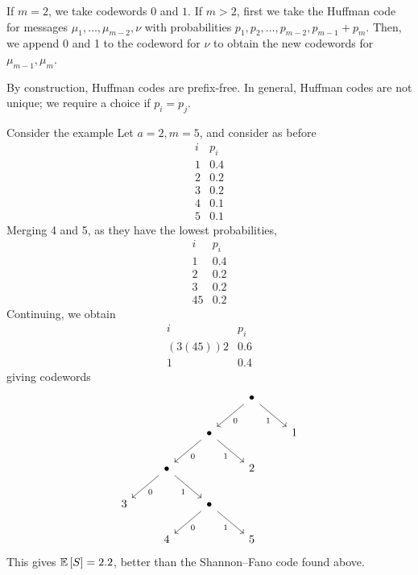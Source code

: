 If \( m = 2 \), we take codewords \( 0 \) and \( 1 \).
If \( m > 2 \), first we take the Huffman code for messages \( \mu_1, \dots, \mu_{m-2}, \nu \) with probabilities \( p_1, p_2, \dots, p_{m-2}, p_{m-1} + p_m \).
Then, we append 0 and 1 to the codeword for \( \nu \) to obtain the new codewords for \( \mu_{m-1}, \mu_m \).
\begin{remark}
    By construction, Huffman codes are prefix-free.
    In general, Huffman codes are not unique; we require a choice if \( p_i = p_j \).
\end{remark}
\begin{example}
    Consider the example
    Let \( a = 2, m = 5 \), and consider as before
    \[ \begin{array}{cc}
            i & p_i \\
            1 & 0.4 \\
            2 & 0.2 \\
            3 & 0.2 \\
            4 & 0.1 \\
            5 & 0.1
    \end{array} \]
    Merging 4 and 5, as they have the lowest probabilities,
    \[ \begin{array}{cc}
        i & p_i \\
        1 & 0.4 \\
        2 & 0.2 \\
        3 & 0.2 \\
        45 & 0.2
    \end{array} \]
    Continuing, we obtain
    \[ \begin{array}{cc}
        i & p_i \\
        (3(45))2 & 0.6 \\
        1 & 0.4
    \end{array} \]
    giving codewords
    \[\begin{tikzcd}
        &&& \bullet \\
        && \bullet && 1 \\
        & \bullet && 2 \\
        3 && \bullet \\
        & 4 && 5
        \arrow["0", from=3-2, to=4-1]
        \arrow["1"', from=3-2, to=4-3]
        \arrow["0", from=4-3, to=5-2]
        \arrow["1"', from=4-3, to=5-4]
        \arrow["0", from=2-3, to=3-2]
        \arrow["1"', from=2-3, to=3-4]
        \arrow["0", from=1-4, to=2-3]
        \arrow["1"', from=1-4, to=2-5]
    \end{tikzcd}\]
    This gives \( \mathbb{E}\left[{S}\right] = 2.2 \), better than the Shannon--Fano code found above.
\end{example}
